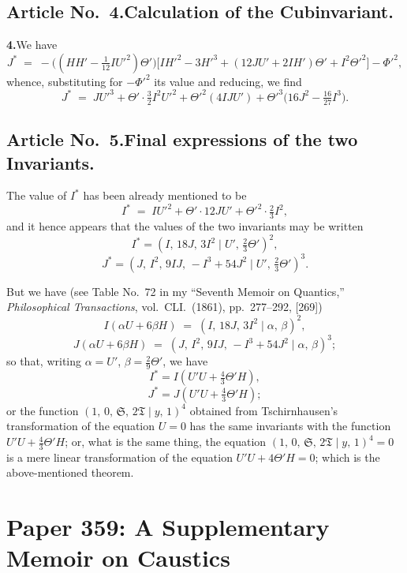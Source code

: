 \documentclass[11pt]{article}
\begin{document}
\subsection*{Article No.~4.\quad Calculation of the Cubinvariant.}

\textbf{4.}\quad We have
\[
J^{*} \;=\; -\bigl((H H' - \tfrac{1}{12} I U'^{2})\Theta'\bigr)\bigl[I H'^{2} - 3 H'^{3} + (12 J U' + 2 I H')\Theta' + I^{2} \Theta'^{2}\bigr] - \Phi'^{2},
\]
whence, substituting for $-\Phi'^{2}$ its value and reducing, we find
\[
J^{*} \;=\; J U'^{3} + \Theta' \cdot \tfrac{3}{2} I^{2} U'^{2} + \Theta'^{2}(4 I J U') + \Theta'^{3}\bigl(16 J^{2} - \tfrac{16}{27} I^{3}\bigr).
\]

\subsection*{Article No.~5.\quad Final expressions of the two Invariants.}

The value of $I^{*}$ has been already mentioned to be
\[
I^{*} \;=\; I U'^{2} + \Theta' \cdot 12 J U' + \Theta'^{2} \cdot \tfrac{2}{3} I^{2},
\]
and it hence appears that the values of the two invariants may be written
\[
I^{*} = (I,\,18 J,\,3 I^{2} \mid U',\,\tfrac{2}{3}\Theta')^{2},
\]
\[
J^{*} = (J,\,I^{2},\,9 I J,\,-I^{3} + 54 J^{2} \mid U',\,\tfrac{2}{3}\Theta')^{3}.
\]

But we have (see Table No.~72 in my ``Seventh Memoir on Quantics,'' \textit{Philosophical Transactions}, vol.\ CLI.\ (1861), pp.\ 277--292, [269])
\[
I(\alpha U + 6\beta H) \;=\; (I,\,18 J,\,3 I^{2} \mid \alpha,\,\beta)^{2},
\]
\[
J(\alpha U + 6\beta H) \;=\; (J,\,I^{2},\,9 I J,\,-I^{3} + 54 J^{2} \mid \alpha,\,\beta)^{3};
\]
so that, writing $\alpha = U'$, $\beta = \tfrac{2}{9}\Theta'$, we have
\[
I^{*} = I(U' U + \tfrac{4}{3}\Theta' H),
\]
\[
J^{*} = J(U' U + \tfrac{4}{3}\Theta' H);
\]
or the function $(1,\,0,\,\mathfrak{S},\,2\mathfrak{T} \mid y,\,1)^{4}$ obtained from Tschirnhausen's transformation of the equation $U = 0$ has the same invariants with the function $U' U + \tfrac{4}{3}\Theta' H$; or, what is the same thing, the equation $(1,\,0,\,\mathfrak{S},\,2\mathfrak{T} \mid y,\,1)^{4} = 0$ is a mere linear transformation of the equation $U' U + 4\Theta' H = 0$; which is the above-mentioned theorem.

\bigskip
\section*{Paper 359: A Supplementary Memoir on Caustics}
\end{document}
